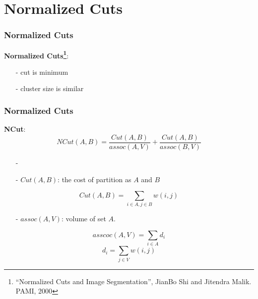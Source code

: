 \documentclass[notheorems,mathserif,table,compress]{beamer}  %
\begin{document}

\section{Normalized Cuts}
\begin{frame}
\frametitle{Normalized Cuts}
   \textbf{\Large Normalized Cuts\footnote{``Normalized Cuts and Image Segmentation'', JianBo Shi and Jitendra Malik. PAMI, 2000}}:\\
   \begin{itemize}
   \item[-] {\color{blue} cut} is minimum 
   \item[-] {\color{blue} cluster} size is similar
   \end{itemize}
\end{frame}


\begin{frame}
\frametitle{Normalized Cuts}
   \textbf{\Large NCut}:\\
\begin{displaymath}
NCut(A,B)= \frac{Cut(A,B)}{assoc(A,V)} + \frac{Cut(A,B)}{assoc(B,V)}	
\end{displaymath}

\begin{itemize}
\item[-] 
\end{itemize}

\begin{itemize}
\item[-] $Cut(A,B) $: the {\color{blue} cost} of partition as $A$ and $B$ 
\end{itemize}
\[ Cut(A,B) = \sum_{i\in A, j\in B} w(i,j) \]
\begin{itemize}
\item[-] $assoc(A,V)$: {\color{blue} volume} of set $A$. 
\end{itemize}
\[ asscoc(A,V)=\sum_{i \in A} {d_{i}} \]
\[ d_{i} = { \sum_{j \in V} w(i,j)} \]
\end{frame}
\end{document}
